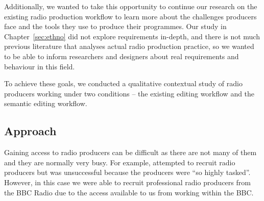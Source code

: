 Additionally, we wanted to take this opportunity to continue our research on the existing radio production workflow to
learn more about the challenges producers face and the tools they use to produce their programmes. Our study in
Chapter~\ref{sec:ethno} did not explore requirements in-depth, and there is not much previous literature that analyses
actual radio production practice, so we wanted to be able to inform researchers and designers about real requirements
and behaviour in this field.

To achieve these goals, we conducted a qualitative contextual study of radio producers working under two conditions --
the existing editing workflow and the semantic editing workflow.


\subsection{Approach}
Gaining access to radio producers can be difficult as there are not many of them and they are normally very busy.
For example, \citet{Kim2003} attempted to recruit radio producers but was unsuccessful because the producers were ``so
highly tasked''. However, in this case we were able to recruit professional radio producers from the BBC Radio due to
the access available to us from working within the BBC.


